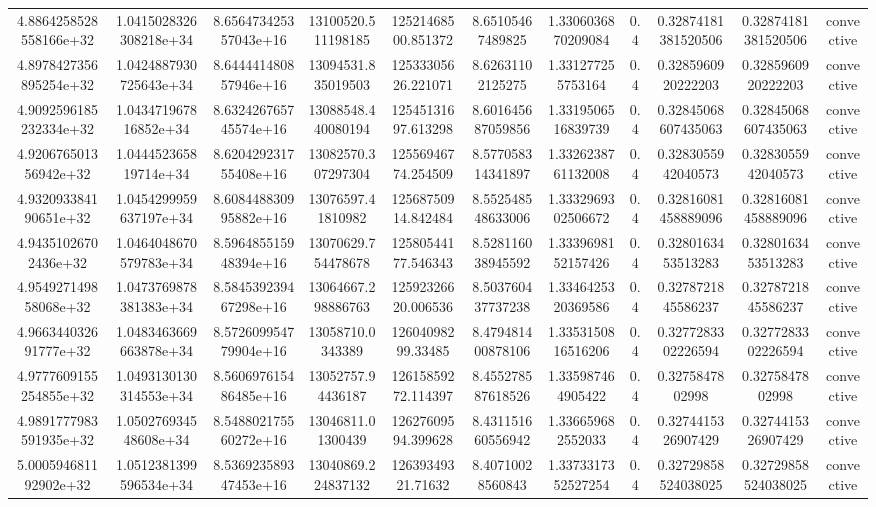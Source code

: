 \begin{table}
\begin{tabular}{ccccccccccc}
4.8864258528558166e+32 & 1.0415028326308218e+34 & 8.656473425357043e+16 & 13100520.511198185 & 12521468500.851372 & 8.65105467489825 & 1.3306036870209084 & 0.4 & 0.32874181381520506 & 0.32874181381520506 & convective \\
4.8978427356895254e+32 & 1.0424887930725643e+34 & 8.644441480857946e+16 & 13094531.835019503 & 12533305626.221071 & 8.62631102125275 & 1.331277255753164 & 0.4 & 0.3285960920222203 & 0.3285960920222203 & convective \\
4.9092596185232334e+32 & 1.043471967816852e+34 & 8.632426765745574e+16 & 13088548.440080194 & 12545131697.613298 & 8.601645687059856 & 1.3319506516839739 & 0.4 & 0.32845068607435063 & 0.32845068607435063 & convective \\
4.920676501356942e+32 & 1.044452365819714e+34 & 8.620429231755408e+16 & 13082570.307297304 & 12556946774.254509 & 8.577058314341897 & 1.3326238761132008 & 0.4 & 0.3283055942040573 & 0.3283055942040573 & convective \\
4.932093384190651e+32 & 1.0454299959637197e+34 & 8.608448830995882e+16 & 13076597.41810982 & 12568750914.842484 & 8.552548548633006 & 1.3332969302506672 & 0.4 & 0.32816081458889096 & 0.32816081458889096 & convective \\
4.94351026702436e+32 & 1.0464048670579783e+34 & 8.596485515948394e+16 & 13070629.754478678 & 12580544177.546343 & 8.528116038945592 & 1.3339698152157426 & 0.4 & 0.3280163453513283 & 0.3280163453513283 & convective \\
4.954927149858068e+32 & 1.0473769878381383e+34 & 8.584539239467298e+16 & 13064667.298886763 & 12592326620.006536 & 8.503760437737238 & 1.3346425320369586 & 0.4 & 0.3278721845586237 & 0.3278721845586237 & convective \\
4.966344032691777e+32 & 1.0483463669663878e+34 & 8.572609954779904e+16 & 13058710.0343389 & 12604098299.33485 & 8.479481400878106 & 1.3353150816516206 & 0.4 & 0.3277283302226594 & 0.3277283302226594 & convective \\
4.9777609155254855e+32 & 1.0493130130314553e+34 & 8.560697615486485e+16 & 13052757.94436187 & 12615859272.114397 & 8.455278587618526 & 1.335987464905422 & 0.4 & 0.3275847802998 & 0.3275847802998 & convective \\
4.9891777983591935e+32 & 1.050276934548608e+34 & 8.548802175560272e+16 & 13046811.01300439 & 12627609594.399628 & 8.431151660556942 & 1.336659682552033 & 0.4 & 0.3274415326907429 & 0.3274415326907429 & convective \\
5.000594681192902e+32 & 1.0512381399596534e+34 & 8.536923589347453e+16 & 13040869.224837132 & 12639349321.71632 & 8.40710028560843 & 1.3373317352527254 & 0.4 & 0.32729858524038025 & 0.32729858524038025 & convective \\

\end{tabular}
\end{table}
